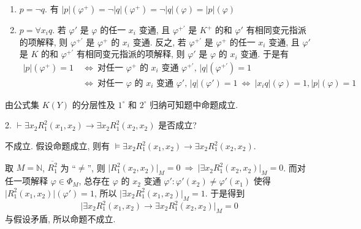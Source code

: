 \documentclass[boxes]{homework}
\begin{document}
\begin{solution}
\begin{enumerate}[label = $\arabic*^\circ$, itemsep = 0em, topsep = .5em, partopsep = .5em]
\begin{enumerate}[label = (\arabic*), itemsep = 0em, topsep = .5em, partopsep = .5em]
                  \item $p = \lnot q$. 有 $\lvert p\rvert(\varphi^+) = \lnot \lvert q\rvert(\varphi^+) = \lnot \lvert q\rvert(\varphi) = \lvert p\rvert(\varphi)$
                  \item $p = \forall x_i q$. 若 $\varphi'$ 是 $\varphi$ 的任一 $x_i$ 变通, 且 $\varphi^{+'}$ 是 $K^+$ 的和 $\varphi'$ 有相同变元指派的项解释, 则 $\varphi^{+'}$ 是 $\varphi^+$ 的 $x_i$ 变通. 反之, 若 $\varphi^{+'}$ 是 $\varphi^+$ 的任一 $x_i$ 变通, 且 $\varphi'$ 是 $K$ 的和 $\varphi^{+'}$ 有相同变元指派的项解释, 则 $\varphi'$ 是 $\varphi$ 的 $x_i$ 变通. 于是有
                        \begin{align*}
                            \lvert p\rvert(\varphi^+) = 1\  & \Leftrightarrow\ \text{对任一 $\varphi^+$ 的 $x_i$ 变通 $\varphi^{+'}$, $\lvert q\rvert(\varphi^{+'}) = 1$}                                                                      \\
                                                            & \Leftrightarrow\ \text{对任一 $\varphi$ 的 $x_i$ 变通 $\varphi'$, $\lvert q\rvert(\varphi') = 1$}\ \Leftrightarrow\ \lvert x_i q\rvert(\varphi) = 1, \lvert p\rvert(\varphi) = 1
                        \end{align*}
              \end{enumerate}
    \end{enumerate}
    由公式集 $K(Y)$ 的分层性及 $1^\circ$ 和 $2^\circ$ 归纳可知题中命题成立.
\end{solution}

\begin{problem}
2. $\vdash \exists x_2 R_1^2(x_1, x_2)\to \exists x_2 R_1^2(x_2, x_2)$ 是否成立?
\end{problem}

\begin{solution}
    不成立. 假设命题成立, 则有 $\vDash \exists x_2 R_1^2(x_1, x_2)\to \exists x_2 R_1^2(x_2, x_2)$.

    取 $M = \mathbb{N}$, $\overline{R_1^2}$ 为 ``$\neq$'', 则 $\lvert R_1^2(x_2, x_2)\rvert_M = 0\ \Rightarrow\ \lvert\exists x_2 R_1^2(x_2, x_2)\rvert_M = 0$. 而对任一项解释 $\varphi\in\Phi_M$, 总存在 $\varphi$ 的 $x_2$ 变通 $\varphi': \varphi'(x_2)\neq\varphi'(x_1)$ 使得 $\lvert R_1^2(x_1, x_2)\rvert(\varphi') = 1$, 所以 $\lvert\exists x_2 R_1^2(x_1, x_2)\rvert_M = 1$. 于是得到
    $$
        \lvert\exists x_2 R_1^2(x_1, x_2)\to \exists x_2 R_1^2(x_2, x_2)\rvert_M = 0
    $$
    与假设矛盾, 所以命题不成立.
\end{solution}
\end{document}
